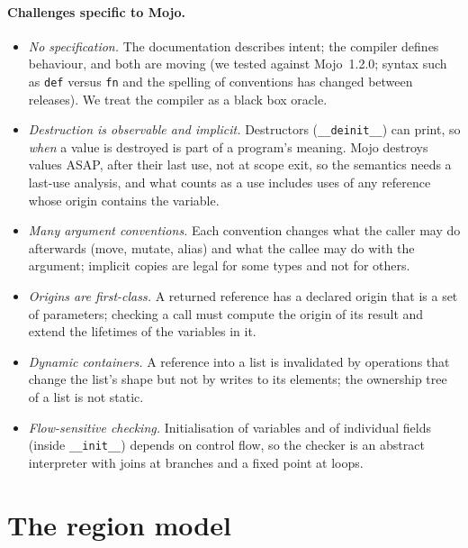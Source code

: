 \documentclass[11pt,a4paper]{article}
\newcommand{\code}[1]{\texttt{#1}}
\begin{document}
\paragraph{Challenges specific to Mojo.}
\begin{itemize}
\item \emph{No specification.} The documentation describes intent; the compiler
  defines behaviour, and both are moving (we tested against Mojo~1.2.0; syntax
  such as \code{def} versus \code{fn} and the spelling of conventions has
  changed between releases). We treat the compiler as a black box oracle.
\item \emph{Destruction is observable and implicit.} Destructors (\code{\_\_deinit\_\_})
  can print, so \emph{when} a value is destroyed is part of a program's meaning.
  Mojo destroys values ASAP, after their last use, not at scope exit, so the
  semantics needs a last-use analysis, and what counts as a use includes uses of
  any reference whose origin contains the variable.
\item \emph{Many argument conventions.} Each convention changes what the caller
  may do afterwards (move, mutate, alias) and what the callee may do with the
  argument; implicit copies are legal for some types and not for others.
\item \emph{Origins are first-class.} A returned reference has a declared origin
  that is a set of parameters; checking a call must compute the origin of its
  result and extend the lifetimes of the variables in it.
\item \emph{Dynamic containers.} A reference into a list is invalidated by
  operations that change the list's shape but not by writes to its elements;
  the ownership tree of a list is not static.
\item \emph{Flow-sensitive checking.} Initialisation of variables and of
  individual fields (inside \code{\_\_init\_\_}) depends on control flow, so the
  checker is an abstract interpreter with joins at branches and a fixed point at
  loops.
\end{itemize}

\section{The region model}\label{sec:region}
\end{document}

